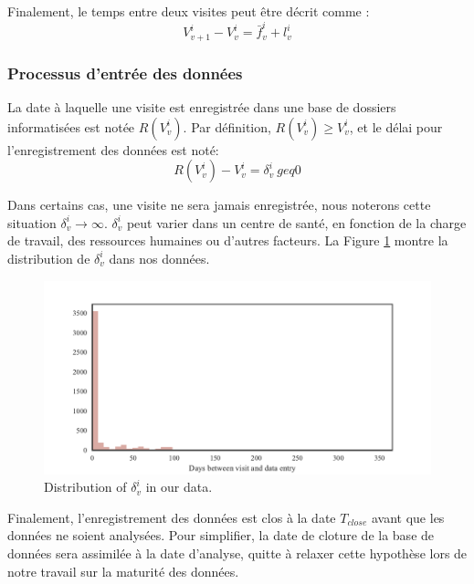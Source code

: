 \documentclass[paper=a4, fontsize=11pt]{scrartcl}
\numberwithin{equation}{section}		%
\numberwithin{figure}{section}			%
\numberwithin{table}{section}				%
\begin{document}
Finalement, le temps entre deux visites peut être décrit comme :
$$V_{v+1}^i - V_v^i = \bar{f}_v^i + l_v^i  $$

\subsubsection{Processus d'entrée des données}

La date à laquelle une visite est enregistrée dans une base de dossiers informatisées est notée $R(V_v^i)$. Par définition, $R(V_v^i) \geq V_v^i$, et le délai pour l'enregistrement des données est noté:
$$R(V_v^i) - V_v^i = \delta_v^i \ geq 0$$

Dans certains cas, une visite ne sera jamais enregistrée, nous noterons cette situation $\delta_v^i \rightarrow \infty$. $\delta_v^i$ peut varier dans un centre de santé, en fonction de la charge de travail, des ressources humaines ou d'autres facteurs. La Figure \ref{fig:data_entry_time} montre la distribution de $\delta_v^i$ dans nos données.

\begin{center}
\begin{figure}[h]
\includegraphics[width=\textwidth]{figure/data_entry_time.pdf}
\caption{Distribution of $\delta_v^i$ in our data.}
\label{fig:data_entry_time}
\end{figure}
\end{center}

Finalement, l'enregistrement des données est clos à la date $T_{close}$ avant que les données ne soient analysées. Pour simplifier, la date de cloture de la base de données sera assimilée à la date d'analyse, quitte à relaxer cette hypothèse lors de notre travail sur la maturité des données.
\end{document}

